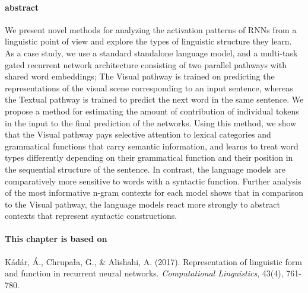 \paragraph{abstract}
  We present novel methods for analyzing the activation patterns of
  RNNs from a linguistic point of view and explore the types of
  linguistic structure they learn. As a case study, we use a standard
  standalone language model, and a multi-task gated
  recurrent network architecture consisting of two parallel pathways with
  shared word embeddings; The {\sc Visual} pathway is trained on predicting the
  representations of the visual scene corresponding to an input
  sentence, whereas the {\sc Textual} pathway is trained to predict the
  next word in the same sentence.
  We propose a method for estimating the amount of contribution
  of individual tokens in the input to the final prediction of the networks.
  Using this method, we show that the {\sc Visual} pathway pays
  selective attention to lexical categories and grammatical functions
  that carry semantic information, and learns to treat word types
  differently depending on their grammatical function and their position
  in the sequential structure of the sentence. In contrast, the language
  models are comparatively more sensitive to words with a syntactic
  function. Further analysis of the most informative n-gram contexts for
  each model shows that in comparison to the {\sc Visual} pathway,
  the language models react more strongly to abstract contexts
  that represent syntactic constructions.

\newpage

\paragraph{This chapter is based on} Kádár, Á., Chrupała, G., \& Alishahi, A. (2017).
Representation of linguistic form and function in recurrent neural networks. \textit{Computational Linguistics}, 
43(4), 761-780.

\newpage







%
%

%

